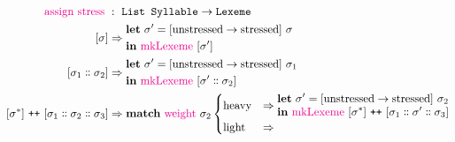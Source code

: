 \documentclass{report}[12pt]
\begin{document}
\begin{align*}
  \text{\textcolor{magenta}{assign stress}}\ & :\ \texttt{List Syllable} \rightarrow \texttt{Lexeme} \\
  [\sigma] & \Rightarrow \begin{aligned}
                                                            & \textbf{let}\ \sigma' = [\text{unstressed} \rightarrow \text{stressed}] \ \sigma \\
                                                            & \textbf{in}\ \text{\textcolor{magenta}{mkLexeme}}\ [\sigma'] \\
                                                          \end{aligned} \\
  [\sigma_1 \dblcolon \sigma_2] & \Rightarrow \begin{aligned}
                                                            & \textbf{let}\ \sigma' = [\text{unstressed} \rightarrow \text{stressed}] \ \sigma_1 \\
                                                            & \textbf{in}\ \text{\textcolor{magenta}{mkLexeme}}\ [\sigma' \dblcolon \sigma_2] \\
                                                          \end{aligned} \\
  [\sigma^{*}]\ \texttt{++}\ [\sigma_1 \dblcolon \sigma_2 \dblcolon \sigma_3] & \Rightarrow \textbf{match}\ \text{\textcolor{magenta}{weight}}\ \sigma_2
                                                      \begin{cases}
                                                        \text{heavy} & \Rightarrow \begin{aligned}
                                                                                     & \textbf{let}\ \sigma' = [\text{unstressed} \rightarrow \text{stressed}]\ \sigma_2 \\
                                                                                     & \textbf{in}\ \text{\textcolor{magenta}{mkLexeme}}\ [\sigma^{*}]\ \texttt{++}\ [\sigma_1 \dblcolon \sigma' \dblcolon \sigma_3] \\
                                                                                   \end{aligned} \\
                                                        \text{light} & \Rightarrow \begin{aligned}

\end{aligned}
\end{cases}
\end{align*}
\end{document}
